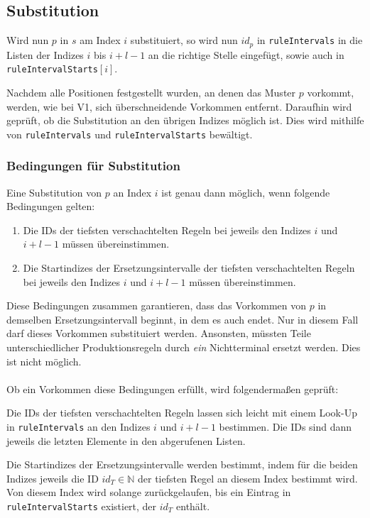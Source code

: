 \subsection{Substitution}
Wird nun $p$ in $s$ am Index $i$ substituiert, so wird nun $id_p$ in \texttt{ruleIntervals} in die Listen der Indizes $i$ bis $i + l - 1$ an die richtige Stelle eingefügt, sowie auch in \texttt{ruleIntervalStarts}$[i]$.

Nachdem alle Positionen festgestellt wurden, an denen das Muster $p$ vorkommt, werden, wie bei V1, sich überschneidende Vorkommen entfernt. Daraufhin wird geprüft, ob die Substitution an den übrigen Indizes möglich ist. Dies wird mithilfe von \texttt{ruleIntervals} und \texttt{ruleIntervalStarts} bewältigt.

\subsubsection{Bedingungen für Substitution} Eine Substitution von $p$ an Index $i$ ist genau dann möglich, wenn folgende Bedingungen gelten:

\begin{enumerate}
	\item Die IDs der tiefsten verschachtelten Regeln bei jeweils den Indizes $i$ und $i + l - 1$ müssen übereinstimmen.
	\item Die Startindizes der Ersetzungsintervalle der tiefsten verschachtelten Regeln bei jeweils den Indizes $i$ und $i + l - 1$ müssen übereinstimmen. 
\end{enumerate}

Diese Bedingungen zusammen garantieren, dass das Vorkommen von $p$ in demselben Ersetzungsintervall beginnt, in dem es auch endet. Nur in diesem Fall darf dieses Vorkommen substituiert werden. Ansonsten, müssten Teile unterschiedlicher Produktionsregeln durch \emph{ein} Nichtterminal ersetzt werden. Dies ist nicht möglich.\\\\
Ob ein Vorkommen diese Bedingungen erfüllt, wird folgendermaßen geprüft:

Die IDs der tiefsten verschachtelten Regeln lassen sich leicht mit einem Look-Up in \texttt{ruleIntervals} an den Indizes $i$ und $i + l - 1$ bestimmen. Die IDs sind dann jeweils die letzten Elemente in den abgerufenen Listen.

Die Startindizes der Ersetzungsintervalle werden bestimmt, indem für die beiden Indizes jeweils die ID $id_T \in \mathbb{N}$ der tiefsten Regel an diesem Index bestimmt wird. Von diesem Index wird solange zurückgelaufen, bis ein Eintrag in \texttt{ruleIntervalStarts} existiert, der $id_T$ enthält.

